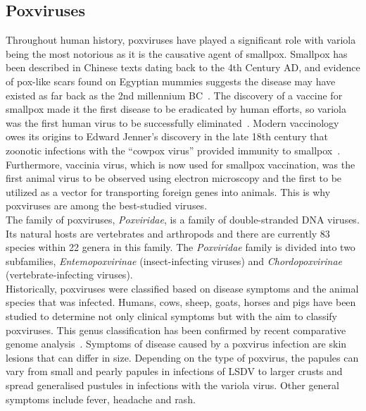 \subsection{Poxviruses}
Throughout human history, poxviruses have played a significant role with variola being the most notorious as it is the causative agent of smallpox. Smallpox has been described in Chinese texts dating back to the 4th Century AD, and evidence of pox-like scars found on Egyptian mummies suggests the disease may have existed as far back as the 2nd millennium BC~\cite{fenner1988history}. The discovery of a vaccine for smallpox made it the first disease to be eradicated by human efforts, so variola was the first human virus to be successfully eliminated~\cite{fenner2000adventures}. Modern vaccinology owes its origins to Edward Jenner's discovery in the late 18th century that zoonotic infections with the ``cowpox virus'' provided immunity to smallpox~\cite{fenner1988history}. Furthermore, vaccinia virus, which is now used for smallpox vaccination, was the first animal virus to be observed using electron microscopy and the first to be utilized as a vector for transporting foreign genes into animals. This is why poxviruses are among the best-studied viruses. \\
The family of poxviruses, \textit{Poxviridae}, is a family of double-stranded \ac{DNA} viruses. Its natural hosts are vertebrates and arthropods and there are currently 83 species within 22 genera in this family. The \textit{Poxviridae} family is divided into two subfamilies, \textit{Entemopoxvirinae} (insect-infecting viruses) and \textit{Chordopoxvirinae} (vertebrate-infecting viruses). \\
Historically, poxviruses were classified based on disease symptoms and the animal species that was infected. Humans, cows, sheep, goats, horses and pigs have been studied to determine not only clinical symptoms but with the aim to classify poxviruses. This genus classification has been confirmed by recent comparative genome analysis~\cite{gubser2004poxvirus}. Symptoms of disease caused by a poxvirus infection are skin lesions that can differ in size. Depending on the type of poxvirus, the papules can vary from small and pearly papules in infections of \ac{LSDV} to larger crusts and spread generalised pustules in infections with the variola virus. Other general symptoms include fever, headache and rash.

